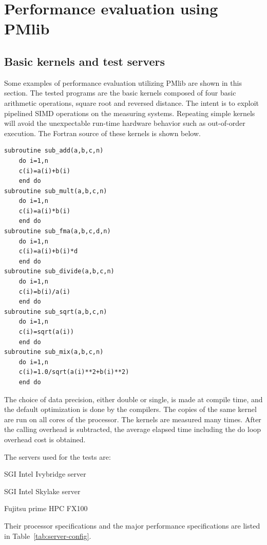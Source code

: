 \documentclass[conference]{IEEEtran}
\begin{document}
\section{Performance evaluation using PMlib}
\label{section:using-PMlib}

\subsection{Basic kernels and test servers}
\label{subsection:basic-kernels}

Some examples of performance evaluation utilizing PMlib are shown in this section.
The tested programs are the basic kernels composed of
four basic arithmetic operations, square root and reversed distance.
%
The intent is to exploit pipelined SIMD operations on the measuring systems.
Repeating simple kernels will avoid the unexpectable run-time hardware behavior
such as out-of-order execution.
The Fortran source of these kernels is shown below.
\begin{lstlisting}
subroutine sub_add(a,b,c,n)
	do i=1,n
	c(i)=a(i)+b(i)
	end do
subroutine sub_mult(a,b,c,n)
	do i=1,n
	c(i)=a(i)*b(i)
	end do
subroutine sub_fma(a,b,c,d,n)
	do i=1,n
	c(i)=a(i)+b(i)*d
	end do
subroutine sub_divide(a,b,c,n)
	do i=1,n
	c(i)=b(i)/a(i)
	end do
subroutine sub_sqrt(a,b,c,n)
	do i=1,n
	c(i)=sqrt(a(i))
	end do
subroutine sub_mix(a,b,c,n)
	do i=1,n
	c(i)=1.0/sqrt(a(i)**2+b(i)**2)
	end do
\end{lstlisting}

The choice of data precision, either double or single, is made at compile time,
and the default optimization is done by the compilers.
The copies of the same kernel are run on all cores of the processor.
The kernels are measured many times. After the calling overhead is subtracted,
the average elapsed time including the do loop overhead cost is obtained.

The servers used for the tests are:
\begin{itemize}
{
\item SGI Intel Ivybridge server
\item SGI Intel Skylake server
\item Fujitsu prime HPC FX100
}
\end{itemize}
Their processor specifications and the major performance specifications
are listed in Table~\ref{tab:server-config}.
\end{document}
